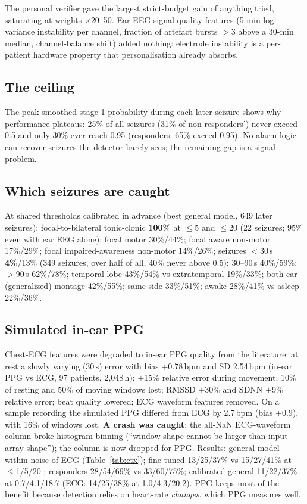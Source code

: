 The personal verifier gave the largest strict-budget gain of anything tried, saturating at weights $\times$20--50. Ear-EEG signal-quality features (5-min log-variance instability per channel, fraction of artefact bursts $>$3 above a 30-min median, channel-balance shift) added nothing: electrode instability is a per-patient hardware property that personalisation already absorbs.

\subsection{The ceiling}

The peak smoothed stage-1 probability during each later seizure shows why performance plateaus: 25\% of all seizures (31\% of non-responders') never exceed 0.5 and only 30\% ever reach 0.95 (responders: 65\% exceed 0.95). No alarm logic can recover seizures the detector barely sees; the remaining gap is a signal problem.

\subsection{Which seizures are caught}

At shared thresholds calibrated in advance (best general model, 649 later seizures): focal-to-bilateral tonic-clonic \textbf{100\%} at $\le$5 and $\le$20 \FAd{} (22 seizures; 95\% even with ear EEG alone); focal motor 30\%/44\%; focal aware non-motor 17\%/29\%; focal impaired-awareness non-motor 14\%/26\%; seizures $<$30\,s \textbf{4\%}/13\% (349 seizures, over half of all, 40\% never above 0.5); 30--90\,s 40\%/59\%; $>$90\,s 62\%/78\%; temporal lobe 43\%/54\% vs extratemporal 19\%/33\%; both-ear (generalized) montage 42\%/55\%; same-side 33\%/51\%; awake 28\%/41\% vs asleep 22\%/36\%.

\subsection{Simulated in-ear PPG}

Chest-ECG features were degraded to in-ear PPG quality from the literature: at rest a slowly varying (30\,s) error with bias +0.78\,bpm and SD 2.54\,bpm (in-ear PPG vs ECG, 97 patients, 2,048\,h); $\pm$15\% relative error during movement; 10\% of resting and 50\% of moving windows lost; RMSSD $\pm$30\% and SDNN $\pm$9\% relative error; beat quality lowered; ECG waveform features removed. On a sample recording the simulated PPG differed from ECG by 2.7\,bpm (bias +0.9), with 16\% of windows lost. \textbf{A crash was caught}: the all-NaN ECG-waveform column broke histogram binning (``window shape cannot be larger than input array shape''); the column is now dropped for PPG. Results: general model within noise of ECG (Table~\ref{tab:ctx}); fine-tuned 13/25/37\% vs 15/27/41\% at $\le$1/5/20 \FAd; responders 28/54/69\% vs 33/60/75\%; calibrated general 11/22/37\% at 0.7/4.1/18.7 \FAd{} (ECG: 14/25/38\% at 1.0/4.3/20.2). PPG keeps most of the benefit because detection relies on heart-rate \emph{changes}, which PPG measures well.


